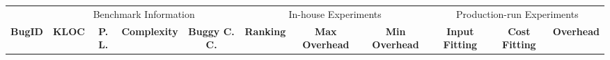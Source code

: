 \begin{table*}[h!]
  \centering
  \scriptsize
  {
  \newcommand{\Yes}[1]{\checkmark{}$_#1$}
  \newcommand{\No}[0]{-}
  {
  \begin{tabular}{lcccc|ccc|ccc}
    \toprule
                  &  \multicolumn{4}{c}{Benchmark Information}           & \multicolumn{3}{c}{In-house Experiments}         & \multicolumn{3}{c}{Production-run Experiments}   \\

    \cmidrule(lr){2-5}
    \cmidrule(lr){6-8}
    \cmidrule(lr){9-11}
    {\bf BugID}    & {\bf KLOC} & {\bf P. L.} & {\bf Complexity} & {\bf Buggy C. C.} & {\bf Ranking} & {\bf Max Overhead} & {\bf Min Overhead} & {\bf Input Fitting} & {\bf Cost Fitting}& {\bf Overhead} \\
    \midrule


\end{tabular}}}
\end{table*}
